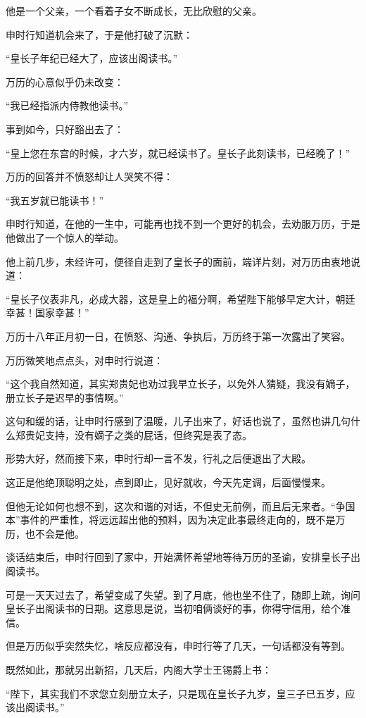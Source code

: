 \begin{multicols}{\theparacolNo}
他是一个父亲，一个看着子女不断成长，无比欣慰的父亲。

申时行知道机会来了，于是他打破了沉默：

“皇长子年纪已经大了，应该出阁读书。”

万历的心意似乎仍未改变：

“我已经指派内侍教他读书。”

事到如今，只好豁出去了：

“皇上您在东宫的时候，才六岁，就已经读书了。皇长子此刻读书，已经晚了！”

万历的回答并不愤怒却让人哭笑不得：

“我五岁就已能读书！”

申时行知道，在他的一生中，可能再也找不到一个更好的机会，去劝服万历，于是他做出了一个惊人的举动。

他上前几步，未经许可，便径自走到了皇长子的面前，端详片刻，对万历由衷地说道：

“皇长子仪表非凡，必成大器，这是皇上的福分啊，希望陛下能够早定大计，朝廷幸甚！国家幸甚！”

万历十八年正月初一日，在愤怒、沟通、争执后，万历终于第一次露出了笑容。

万历微笑地点点头，对申时行说道：

“这个我自然知道，其实郑贵妃也劝过我早立长子，以免外人猜疑，我没有嫡子，册立长子是迟早的事情啊。”

这句和缓的话，让申时行感到了温暖，儿子出来了，好话也说了，虽然也讲几句什么郑贵妃支持，没有嫡子之类的屁话，但终究是表了态。

形势大好，然而接下来，申时行却一言不发，行礼之后便退出了大殿。

这正是他绝顶聪明之处，点到即止，见好就收，今天先定调，后面慢慢来。

但他无论如何也想不到，这次和谐的对话，不但史无前例，而且后无来者。“争国本”事件的严重性，将远远超出他的预料，因为决定此事最终走向的，既不是万历，也不会是他。

谈话结束后，申时行回到了家中，开始满怀希望地等待万历的圣谕，安排皇长子出阁读书。

可是一天天过去了，希望变成了失望。到了月底，他也坐不住了，随即上疏，询问皇长子出阁读书的日期。这意思是说，当初咱俩谈好的事，你得守信用，给个准信。

但是万历似乎突然失忆，啥反应都没有，申时行等了几天，一句话都没有等到。

既然如此，那就另出新招，几天后，内阁大学士王锡爵上书：

“陛下，其实我们不求您立刻册立太子，只是现在皇长子九岁，皇三子已五岁，应该出阁读书。”


\end{multicols}
